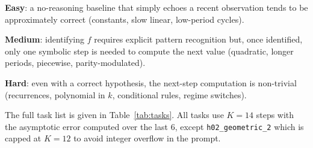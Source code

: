 \documentclass[11pt]{article}
\begin{document}
\textbf{Easy}: a no-reasoning baseline that simply echoes a recent
observation tends to be approximately correct (constants, slow
linear, low-period cycles).

\textbf{Medium}: identifying $f$ requires explicit pattern
recognition but, once identified, only one symbolic step is needed
to compute the next value (quadratic, longer periods, piecewise,
parity-modulated).

\textbf{Hard}: even with a correct hypothesis, the next-step
computation is non-trivial (recurrences, polynomial in $k$,
conditional rules, regime switches).

The full task list is given in Table~\ref{tab:tasks}.  All tasks use
$K = 14$ steps with the asymptotic error computed over the last
$6$, except \verb|h02_geometric_2| which is capped at $K = 12$ to
avoid integer overflow in the prompt.
\end{document}
